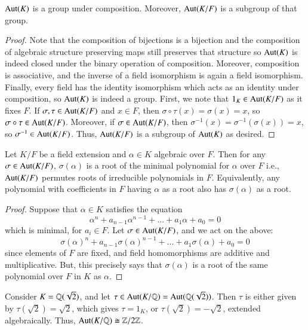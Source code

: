 \begin{proposition}
    $\operatorname{Aut}(K)$ is a group under composition. Moreover, $\operatorname{Aut}(K/F)$ is a subgroup of that group.
\end{proposition}
\begin{proof}
    Note that the composition of bijections is a bijection and the composition of algebraic structure preserving maps still preserves that structure so $\operatorname{Aut}(K)$ is indeed closed under the binary operation of composition. Moreover, composition is associative, and the inverse of a field isomorphism is again a field isomorphism. Finally, every field has the identity isomorphism which acts as an identity under composition, so $\operatorname{Aut}(K)$ is indeed a group. First, we note that $1_K \in \operatorname{Aut}(K/F)$ as it fixes $F$. If $\sigma, \tau \in \operatorname{Aut}(K/F)$ and $x \in F$, then $\sigma\circ \tau(x) = \sigma(x) = x$, so $\sigma \circ \tau \in \operatorname{Aut}(K/F)$. Moreover, if $\sigma \in \operatorname{Aut}(K/F)$, then $\sigma^{-1}(x) = \sigma^{-1}(\sigma(x)) = x$, so $\sigma^{-1} \in \operatorname{Aut}(K/F)$. Thus, $\operatorname{Aut}(K/F)$ is a subgroup of $\operatorname{Aut}(K)$ as desired.
\end{proof}


\begin{proposition}
    Let $K/F$ be a field extension and $\alpha \in K$ algebraic over $F$. Then for any $\sigma \in \operatorname{Aut}(K/F)$, $\sigma(\alpha)$ is a root of the minimal polynomial for $\alpha$ over $F$ i.e., $\operatorname{Aut}(K/F)$ permutes roots of irreducible polynomials in $F$. Equivalently, any polynomial with coefficients in $F$ having $\alpha$ as a root also has $\sigma(\alpha)$ as a root.
\end{proposition}
\begin{proof}
    Suppose that $\alpha \in K$ satisfies the equation \begin{equation*}
        \alpha^n+a_{n-1}\alpha^{n-1}+...+a_1\alpha+a_0 = 0
    \end{equation*}
    which is minimal, for $a_i \in F$. Let $\sigma \in \operatorname{Aut}(K/F)$, and we act on the above: \begin{equation*}
        \sigma(\alpha)^n + a_{n-1}\sigma(\alpha)^{n-1}+...+a_1\sigma(\alpha)+a_0 = 0
    \end{equation*}
    since elements of $F$ are fixed, and field homomorphisms are additive and multiplicative. But, this precisely says that $\sigma(\alpha)$ is a root of the same polynomial over $F$ in $K$ as $\alpha$.
\end{proof}

\begin{example}
    Consider $K = \mathbb Q(\sqrt{2})$, and let $\tau \in \operatorname{Aut}(K/\mathbb Q) = \operatorname{Aut}(\mathbb Q(\sqrt{2}))$. Then $\tau$ is either given by $\tau(\sqrt{2}) = \sqrt{2}$, which gives $\tau = 1_K$, or $\tau(\sqrt{2}) = -\sqrt{2}$, extended algebraically. Thus, $\operatorname{Aut}(K/\mathbb Q) \cong \mathbb Z/2\mathbb Z$.
\end{example}

